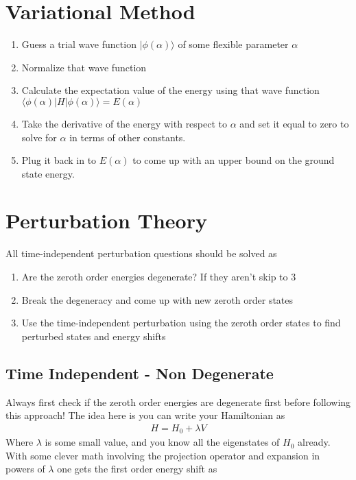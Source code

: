 \section{Variational Method}
\begin{enumerate}
\item Guess a trial wave function $|\phi(\alpha)\rangle$ of some flexible parameter $\alpha$
\item Normalize that wave function
\item Calculate the expectation value of the energy using that wave function $\langle \phi(\alpha) |H|\phi(\alpha)\rangle = E(\alpha)$
\item Take the derivative of the energy with respect to $\alpha$ and set it equal to zero to solve for $\alpha$ in terms of other constants.
\item Plug it back in to $E(\alpha)$ to come up with an upper bound on the ground state energy.
\end{enumerate}




\section{Perturbation Theory}

All time-independent perturbation questions should be solved as
\begin{enumerate}
\item Are the zeroth order energies degenerate? If they aren't skip to 3
\item Break the degeneracy and come up with new zeroth order states
\item Use the time-independent perturbation using the zeroth order states to find perturbed states and energy shifts
\end{enumerate}


\subsection{Time Independent - Non Degenerate}
Always first check if the zeroth order energies are degenerate first before following this approach! The idea here is you can write your Hamiltonian as
\begin{align}
H = H_0 + \lambda V
\end{align}
Where $\lambda$ is some small value, and you know all the eigenstates of $H_0$ already. With some clever math involving the projection operator and expansion in powers of $\lambda$ one gets the first order energy shift\cite{sakurai} as

